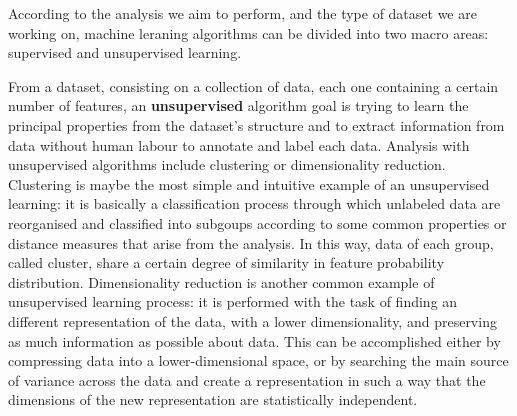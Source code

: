 \documentclass[10pt]{report}
\begin{document}
According to the analysis we aim to perform, and the type of dataset we are working on, machine leraning algorithms can be divided into two macro areas: supervised and unsupervised learning.

From a dataset, consisting on a collection of data, each one containing a certain number of features, an \textbf{unsupervised} algorithm goal is trying to learn the principal properties from the dataset's structure and to extract information from data without human labour to annotate and label each data.
Analysis with unsupervised algorithms include clustering or dimensionality reduction.
Clustering is maybe the most simple and intuitive example of an unsupervised learning: it is basically a classification process through which unlabeled data are reorganised and classified into subgoups according to some common properties or distance measures that arise from the analysis.
In this way, data of each group, called cluster, share a certain degree of similarity in feature probability distribution.
Dimensionality reduction is another common example of unsupervised learning process: it is performed with the task of finding an different representation of the data, with a lower dimensionality, and preserving as much information as possible about data.
This can be accomplished either by compressing data into a lower-dimensional space, or by searching the main source of variance across the data and create a representation in such a way that the dimensions of the new representation are statistically independent.



\end{document}

